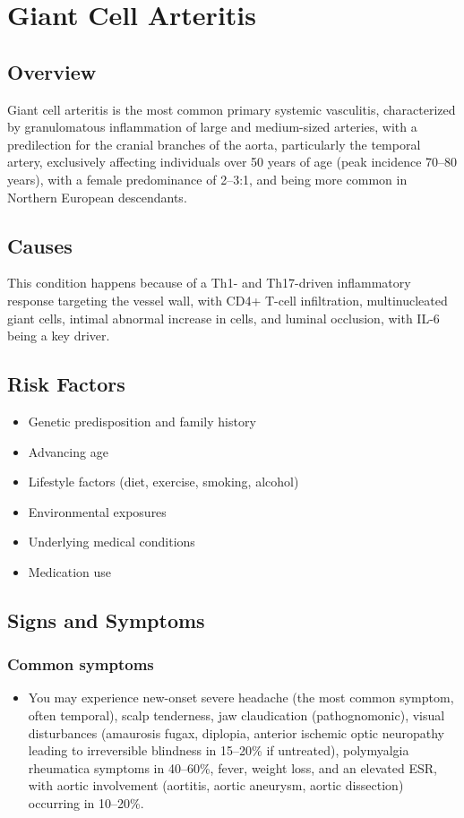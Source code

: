 \chapter{Giant Cell Arteritis}
\label{sec:Giant Cell Arteritis}

\section{Overview}
Giant cell arteritis is the most common primary systemic vasculitis, characterized by granulomatous inflammation of large and medium-sized arteries, with a predilection for the cranial branches of the aorta, particularly the temporal artery, exclusively affecting individuals over 50 years of age (peak incidence 70--80 years), with a female predominance of 2--3:1, and being more common in Northern European descendants.
\section{Causes}
This condition happens because of a Th1- and Th17-driven inflammatory response targeting the vessel wall, with CD4+ T-cell infiltration, multinucleated giant cells, intimal abnormal increase in cells, and luminal occlusion, with IL-6 being a key driver.     
\section{Risk Factors}

\begin{itemize}[noitemsep]
  \item Genetic predisposition and family history
  \item Advancing age
  \item Lifestyle factors (diet, exercise, smoking, alcohol)
  \item Environmental exposures
  \item Underlying medical conditions
  \item Medication use
\end{itemize}
\section{Signs and Symptoms}

\subsection{Common symptoms}
\begin{itemize}[noitemsep]
  \item You may experience new-onset severe headache (the most common symptom, often temporal), scalp tenderness, jaw claudication (pathognomonic), visual disturbances (amaurosis fugax, diplopia, anterior ischemic optic neuropathy leading to irreversible blindness in 15--20\% if untreated), polymyalgia rheumatica symptoms in 40--60\%, fever, weight loss, and an elevated ESR, with aortic involvement (aortitis, aortic aneurysm, aortic dissection) occurring in 10--20\%. 
  \end{itemize}

